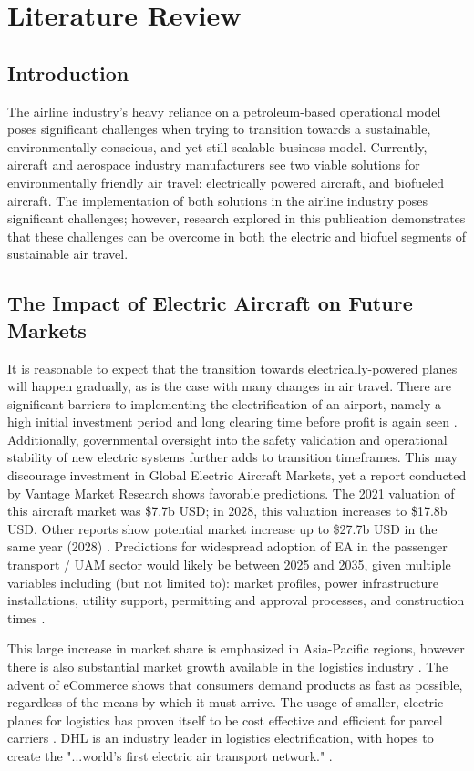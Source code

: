 \documentclass[../main.tex]{subfiles}
\begin{document}
\section{Literature Review}\label{litReview}
\subsection{Introduction}\label{designIntro}
The airline industry's heavy reliance on a petroleum-based operational model poses significant challenges when trying to transition towards a sustainable, environmentally conscious, and yet still scalable business model. Currently, aircraft and aerospace industry manufacturers see two viable solutions for environmentally friendly air travel: electrically powered aircraft, and biofueled aircraft. The implementation of both solutions in the airline industry poses significant challenges; however, research explored in this publication demonstrates that these challenges can be overcome in both the electric and biofuel segments of sustainable air travel.\par
\subsection{The Impact of Electric Aircraft on Future Markets}
It is reasonable to expect that the transition towards electrically-powered planes will happen gradually, as is the case with many changes in air travel. There are significant barriers to implementing the electrification of an airport, namely a high initial investment period and long clearing time before profit is again seen \cite{ref24}.  Additionally, governmental oversight into the safety validation and operational stability of new electric systems further adds to transition timeframes.\cite{ref24} This may discourage investment in Global Electric Aircraft Markets, yet a report conducted by Vantage Market Research shows favorable predictions. The 2021 valuation of this aircraft market was \$7.7b USD; in 2028, this valuation increases to \$17.8b USD. Other reports show potential market increase up to \$27.7b USD in the same year (2028) \cite{ref26}. Predictions for widespread adoption of EA in the passenger transport / UAM sector would likely be between 2025 and 2035, given multiple variables including (but not limited to): market profiles, power infrastructure installations, utility support, permitting and approval processes, and construction times \cite{ref40}.\par
This large increase in market share is emphasized in Asia-Pacific regions, however there is also substantial market growth available in the logistics industry \cite{ref24}. The advent of eCommerce shows that consumers demand products as fast as possible, regardless of the means by which it must arrive. The usage of smaller, electric planes for logistics has proven itself to be cost effective and efficient for parcel carriers \cite{ref27}. DHL is an industry leader in logistics electrification, with hopes to create the "...world's first electric air transport network." \cite{ref27}.\par
\end{document}

